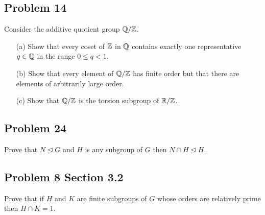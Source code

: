 \subsection{Problem 14}
Consider the additive quotient group $\mathbb{Q}/\mathbb{Z}$. 
\begin{enumerate}
    \item[(a)] Show that every coset of $\mathbb{Z}$ in $\mathbb{Q}$ contains exactly one representative $q\in \mathbb{Q}$ in the range $0\leq q < 1$.
    \item[(b)] Show that every element of $\mathbb{Q}/\mathbb{Z}$ has finite order but that there are elements of arbitrarily large order.
    \item[(c)] Show that $\mathbb{Q}/\mathbb{Z}$ is the torsion subgroup of $\mathbb{R}/\mathbb{Z}$.
\end{enumerate}

\subsection{Problem 24}
\begin{prob}
    Prove that $N \trianglelefteq G$ and $H$ is any subgroup of $G$ then $N \cap H \trianglelefteq H$.
\end{prob}

\subsection{Problem 8 Section 3.2}
\begin{prob}
    Prove that if $H$ and $K$ are finite subgroups of $G$ whose orders are relatively prime then $H \cap K = 1$. 
\end{prob}



